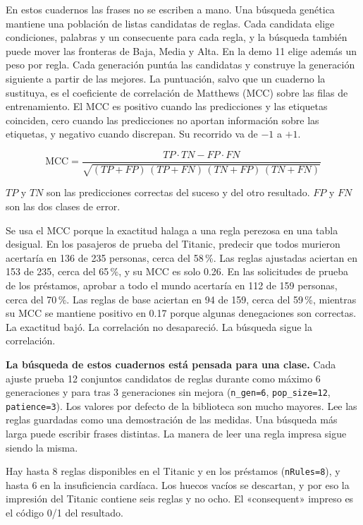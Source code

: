 \documentclass[11pt]{article}
\newcommand{\fn}[1]{\texttt{\small #1}}
\newcommand{\pct}[1]{\mbox{#1\,\%}}
\begin{document}
En estos cuadernos las frases no se escriben a mano. Una búsqueda genética mantiene una población de listas candidatas de reglas. Cada candidata elige condiciones, palabras y un consecuente para cada regla, y la búsqueda también puede mover las fronteras de Baja, Media y Alta. En la demo 11 elige además un peso por regla. Cada generación puntúa las candidatas y construye la generación siguiente a partir de las mejores. La puntuación, salvo que un cuaderno la sustituya, es el coeficiente de correlación de Matthews (MCC) sobre las filas de entrenamiento. El MCC es positivo cuando las predicciones y las etiquetas coinciden, cero cuando las predicciones no aportan información sobre las etiquetas, y negativo cuando discrepan. Su recorrido va de \(-1\) a \(+1\).

\[
\mathrm{MCC}
=
\frac{TP \cdot TN - FP \cdot FN}
{\sqrt{(TP+FP)\,(TP+FN)\,(TN+FP)\,(TN+FN)}}
\]

\(TP\) y \(TN\) son las predicciones correctas del suceso y del otro resultado. \(FP\) y \(FN\) son las dos clases de error.

Se usa el MCC porque la exactitud halaga a una regla perezosa en una tabla desigual. En los pasajeros de prueba del Titanic, predecir que todos murieron acertaría en 136 de 235 personas, cerca del \pct{58}. Las reglas ajustadas aciertan en 153 de 235, cerca del \pct{65}, y su MCC es solo 0.26. En las solicitudes de prueba de los préstamos, aprobar a todo el mundo acertaría en 112 de 159 personas, cerca del \pct{70}. Las reglas de base aciertan en 94 de 159, cerca del \pct{59}, mientras su MCC se mantiene positivo en 0.17 porque algunas denegaciones son correctas. La exactitud bajó. La correlación no desapareció. La búsqueda sigue la correlación.

\begin{careful}
\textbf{La búsqueda de estos cuadernos está pensada para una clase.} Cada ajuste prueba 12 conjuntos candidatos de reglas durante como máximo 6 generaciones y para tras 3 generaciones sin mejora (\fn{n\_gen=6}, \fn{pop\_size=12}, \fn{patience=3}). Los valores por defecto de la biblioteca son mucho mayores. Lee las reglas guardadas como una demostración de las medidas. Una búsqueda más larga puede escribir frases distintas. La manera de leer una regla impresa sigue siendo la misma.
\end{careful}

Hay hasta 8 reglas disponibles en el Titanic y en los préstamos (\fn{nRules=8}), y hasta 6 en la insuficiencia cardíaca. Los huecos vacíos se descartan, y por eso la impresión del Titanic contiene seis reglas y no ocho. El «consequent» impreso es el código 0/1 del resultado.
\end{document}
